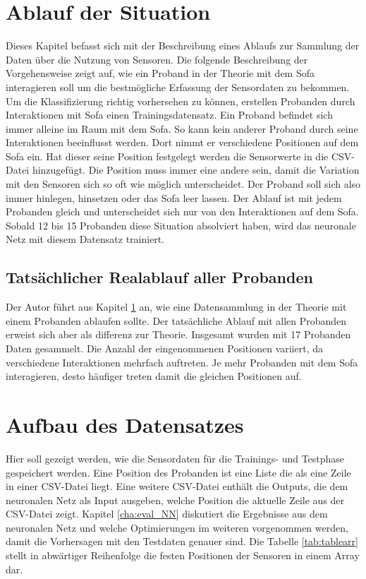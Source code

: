 \section{Ablauf der Situation}
\label{sec:abl}
Dieses Kapitel befasst sich mit der Beschreibung eines Ablaufs zur Sammlung der Daten über die Nutzung von Sensoren. Die folgende Beschreibung der Vorgehensweise zeigt auf, wie ein Proband in der Theorie mit dem Sofa interagieren soll um die bestmögliche Erfassung der Sensordaten zu bekommen.
\newline
\newline
Um die Klassifizierung richtig vorhersehen zu können, erstellen Probanden durch Interaktionen mit Sofa einen Trainingsdatensatz. Ein Proband befindet sich immer alleine im Raum mit dem Sofa. So kann kein anderer Proband durch seine Interaktionen beeinflusst werden. Dort nimmt er verschiedene Positionen auf dem Sofa ein. Hat dieser seine Position festgelegt werden die Sensorwerte in die CSV-Datei hinzugefügt. Die Position muss immer eine andere sein, damit die Variation mit den Sensoren sich so oft wie möglich unterscheidet. Der Proband soll sich also immer hinlegen, hinsetzen oder das Sofa leer lassen. Der Ablauf ist mit jedem Probanden gleich und unterscheidet sich nur von den Interaktionen auf dem Sofa. Sobald 12 bis 15 Probanden diese Situation absolviert haben, wird das neuronale Netz mit diesem Datensatz trainiert.

\subsection{Tatsächlicher Realablauf aller Probanden}
\label{sub:real}
Der Autor führt aus Kapitel \ref{sec:abl} an, wie eine Datensammlung in der Theorie mit einem Probanden ablaufen sollte. Der tatsächliche Ablauf mit allen Probanden erweist sich aber als differenz zur Theorie. Insgesamt wurden mit 17 Probanden Daten gesammelt. Die Anzahl der eingenommenen Positionen variiert, da verschiedene Interaktionen mehrfach auftreten. Je mehr Probanden mit dem Sofa interagieren, desto häufiger treten damit die gleichen Positionen auf.

\section{Aufbau des Datensatzes}
Hier soll gezeigt werden, wie die Sensordaten für die Trainings- und Testphase gespeichert werden. Eine Position des Probanden ist eine Liste die als eine Zeile in einer CSV-Datei liegt. Eine weitere CSV-Datei enthält die Outputs, die dem neuronalen Netz als Input ausgeben, welche Position die aktuelle Zeile aus der CSV-Datei zeigt. Kapitel \ref{cha:eval_NN} diskutiert die Ergebnisse aus dem neuronalen Netz und welche Optimierungen im weiteren vorgenommen werden, damit die Vorhersagen mit den Testdaten genauer sind. Die Tabelle \ref{tab:tablearr} stellt in abwärtiger Reihenfolge die festen Positionen der Sensoren in einem Array dar.

